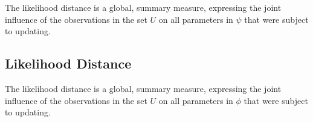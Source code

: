 \documentclass[00-ResidualsMain.tex]{subfiles}
\begin{document}
The likelihood distance is a global, summary measure, expressing the joint influence of the observations in
the set $U$ on all parameters in $\psi$  that were subject to updating.

\subsection{Likelihood Distance}

The  likelihood distance is a global, summary measure, expressing the joint influence of the observations in the set $U$ on all parameters in $\phi$  that were subject to updating.




\end{document}
